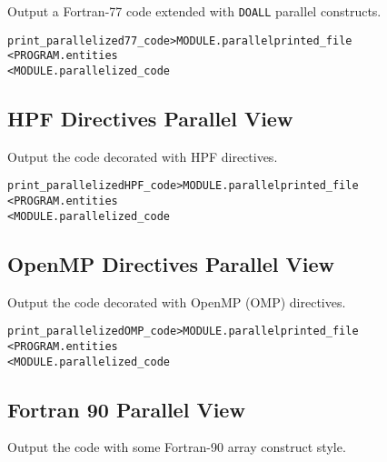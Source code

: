 \documentclass[a4paper]{report}
\newenvironment{PipsMake}{\begin{alltt}}{\end{alltt}}
\newenvironment{PipsPass}[1]{\label{pass:#1}}{}
\begin{document}
\begin{PipsPass}{print_parallelized77_code}
Output a Fortran-77 code extended with {\tt DOALL} parallel constructs.
\end{PipsPass}

\begin{PipsMake}
print_parallelized77_code       > MODULE.parallelprinted_file
        < PROGRAM.entities
        < MODULE.parallelized_code
\end{PipsMake}



\subsection{HPF Directives Parallel View}

\begin{PipsPass}{print_parallelizedHPF_code}
Output the code decorated with HPF directives.
\end{PipsPass}

\begin{PipsMake}
print_parallelizedHPF_code     > MODULE.parallelprinted_file
        < PROGRAM.entities
        < MODULE.parallelized_code
\end{PipsMake}


\subsection{OpenMP Directives Parallel View}

\begin{PipsPass}{print_parallelizedOMP_code}
Output the code decorated with OpenMP (OMP) directives.
\end{PipsPass}

\begin{PipsMake}
print_parallelizedOMP_code     > MODULE.parallelprinted_file
        < PROGRAM.entities
        < MODULE.parallelized_code
\end{PipsMake}


\subsection{Fortran 90 Parallel View}

\begin{PipsPass}{print_parallelized90_code}
Output the code with some Fortran-90 array construct style.
\end{PipsPass}
\end{document}
